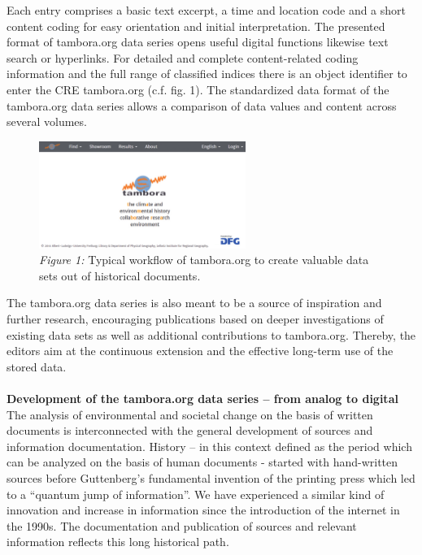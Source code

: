 Each entry comprises a basic text excerpt, a time and location code and a short content coding for easy orientation and initial interpretation. The presented format of tambora.org data series opens useful digital functions likewise text search or hyperlinks. For detailed and complete content-related coding information and the full range of classified indices there is an object identifier to enter the CRE tambora.org (c.f. fig. 1). The standardized data format of the tambora.org data series allows a comparison of data values and content across several volumes.
\vspace{0.25cm}\\
\begin{figure}[H]
	\begin{center}
 \includegraphics[width=0.6\textwidth]{fig/notes/startpage.pdf}
 \caption*{\textit{Figure 1:} Typical workflow of tambora.org to create valuable data sets out of historical documents.}
 \end{center}
\end{figure}
The tambora.org data series is also meant to be a source of inspiration and further research, encouraging publications based on deeper investigations of existing data sets as well as additional contributions to tambora.org. Thereby, the editors aim at the continuous extension and the effective long-term use of the stored data. 
\\\\
\textbf{Development of the tambora.org data series – from analog to digital}
\vspace{0.25cm}\\
The analysis of environmental and societal change on the basis of written documents is interconnected with the general development of sources and information documentation. History – in this context defined as the period which can be analyzed on the basis of human documents - started with hand-written sources before Guttenberg’s fundamental invention of the printing press which led to a “quantum jump of information”. We have experienced a similar kind of innovation and increase in information since the introduction of the internet in the 1990s. The documentation and publication of sources and relevant information reflects this long historical path.

